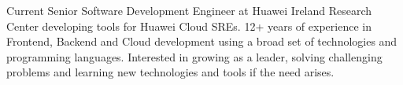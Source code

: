 

\begin{cvparagraph}

Current Senior Software Development Engineer at Huawei Ireland Research Center developing tools for Huawei Cloud SREs. 12+ years of experience in Frontend, Backend and Cloud development using a broad set of technologies and programming languages. Interested in growing as a leader, solving challenging problems and learning new technologies and tools if the need arises.
\end{cvparagraph}
